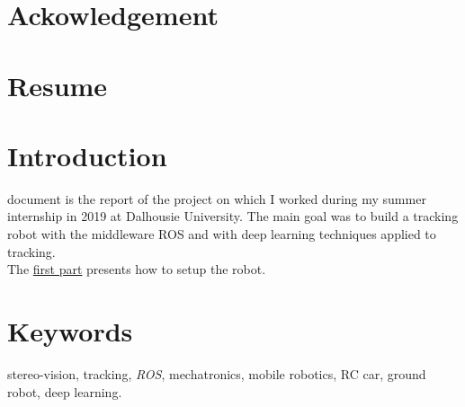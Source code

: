 

\section*{Ackowledgement}\label{thk}


\clearpage

\section*{Resume}


\clearpage
\section*{Introduction}

 document is the report of the project on which 
I worked during my summer internship in 2019 at Dalhousie 
University. The main goal was to build a tracking robot
with the middleware ROS and with deep learning techniques 
applied to tracking.
\\\indent The \hyperref[setup]{first part} presents how to 
setup the robot.

\section*{Keywords} stereo-vision, tracking, \textit{ROS},
mechatronics, mobile robotics, RC car, ground robot, deep learning.



